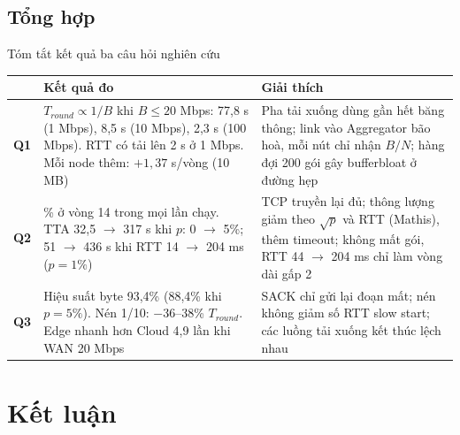 \documentclass[aspectratio=169,10pt]{beamer}
\begin{document}
\subsection{Tổng hợp}
\begin{frame}{Tóm tắt kết quả ba câu hỏi nghiên cứu}{}
  \footnotesize
  \begin{tabularx}{\textwidth}{c >{\raggedright\arraybackslash}X >{\raggedright\arraybackslash}X}
    \toprule
    & \textbf{Kết quả đo} & \textbf{Giải thích} \\
    \midrule
    \textbf{Q1} & $T_{round} \propto 1/B$ khi $B \le 20$ Mbps: 77,8 s (1 Mbps), 8,5 s (10 Mbps), 2,3 s (100 Mbps). RTT có tải lên 2 s ở 1 Mbps. Mỗi node thêm: $+1{,}37$ s/vòng (10 MB) & Pha tải xuống dùng gần hết băng thông; link vào Aggregator bão hoà, mỗi nút chỉ nhận $B/N$; hàng đợi 200 gói gây bufferbloat ở đường hẹp \\
    \midrule
    \textbf{Q2} & 90\% ở vòng 14 trong mọi lần chạy. TTA 32,5 $\to$ 317 s khi $p$: 0 $\to$ 5\%; 51 $\to$ 436 s khi RTT 14 $\to$ 204 ms ($p = 1\%$) & TCP truyền lại đủ; thông lượng giảm theo $\sqrt{p}$ và RTT (Mathis), thêm timeout; không mất gói, RTT 44 $\to$ 204 ms chỉ làm vòng dài gấp 2 \\
    \midrule
    \textbf{Q3} & Hiệu suất byte 93,4\% (88,4\% khi $p = 5\%$). Nén 1/10: $-$36--38\% $T_{round}$. Edge nhanh hơn Cloud 4,9 lần khi WAN 20 Mbps & SACK chỉ gửi lại đoạn mất; nén không giảm số RTT slow start; các luồng tải xuống kết thúc lệch nhau \\
    \bottomrule
  \end{tabularx}
\end{frame}

\section{Kết luận}
\end{document}
